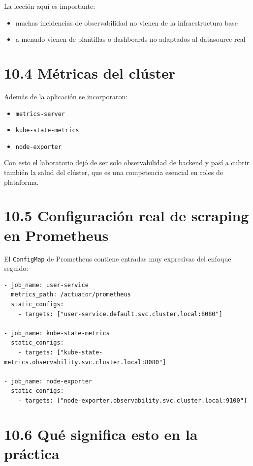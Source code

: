 \documentclass[
a4paper,
12pt]{report}
\providecommand{\tightlist}{%
  \setlength{\itemsep}{0pt}\setlength{\parskip}{0pt}}
\begin{document}
La lección aquí es importante:

\begin{itemize}
\tightlist
\item
  muchas incidencias de observabilidad no vienen de la infraestructura
  base
\item
  a menudo vienen de plantillas o dashboards no adaptados al datasource
  real
\end{itemize}

\section{10.4 Métricas del clúster}\label{muxe9tricas-del-cluxfaster}

Además de la aplicación se incorporaron:

\begin{itemize}
\tightlist
\item
  \texttt{metrics-server}
\item
  \texttt{kube-state-metrics}
\item
  \texttt{node-exporter}
\end{itemize}

Con esto el laboratorio dejó de ser solo observabilidad de backend y
pasí a cubrir también la salud del clúster, que es una competencia
esencial en roles de plataforma.

\section{10.5 Configuración real de scraping en
Prometheus}\label{configuraciuxf3n-real-de-scraping-en-prometheus}

El \texttt{ConfigMap} de Prometheus contiene entradas muy expresivas del
enfoque seguido:

\begin{verbatim}
- job_name: user-service
  metrics_path: /actuator/prometheus
  static_configs:
    - targets: ["user-service.default.svc.cluster.local:8080"]

- job_name: kube-state-metrics
  static_configs:
    - targets: ["kube-state-metrics.observability.svc.cluster.local:8080"]

- job_name: node-exporter
  static_configs:
    - targets: ["node-exporter.observability.svc.cluster.local:9100"]
\end{verbatim}

\section{10.6 Qué significa esto en la
práctica}\label{quuxe9-significa-esto-en-la-pruxe1ctica}
\end{document}
